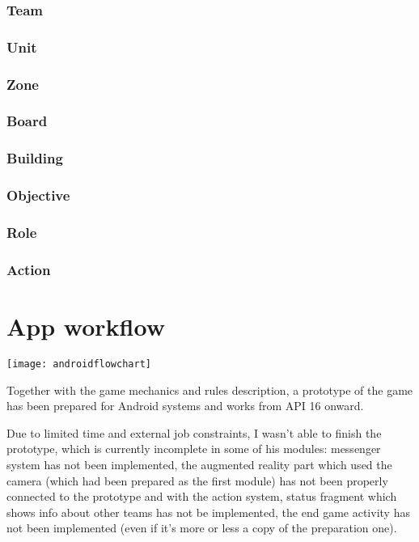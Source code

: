			\subsubsection{Team}
			
			\subsubsection{Unit}
			
			\subsubsection{Zone}
			
			\subsubsection{Board}
			
			\subsubsection{Building}
			
			\subsubsection{Objective}
			
			\subsubsection{Role}
			
			\subsubsection{Action}
			
	\section{App workflow}\label{app:workflow}
	
		\texttt{[image: androidflowchart]}
		
		Together with the game mechanics and rules description, a prototype of the game has been prepared for Android systems and works from API 16 onward.
			
		Due to limited time and external job constraints, I wasn't able to finish the prototype, which is currently incomplete in some of his modules: messenger system has not been implemented, the augmented reality part which used the camera (which had been prepared as the first module) has not been properly connected to the prototype and with the action system, status fragment which shows info about other teams has not be implemented, the end game activity has not been implemented (even if it's more or less a copy of the preparation one).
			
